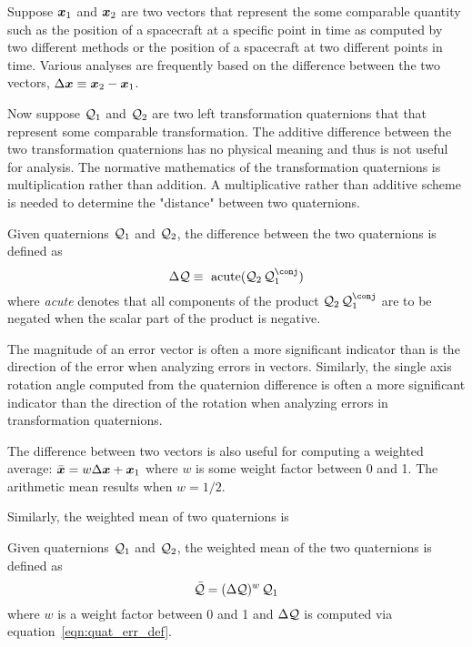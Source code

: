 Suppose $\boldsymbol{x}_1$ and $\boldsymbol{x}_2$ are two vectors
that represent the some comparable quantity
such as the position of a spacecraft at a specific point in time as computed
by two different methods
or the position of a spacecraft at two different points in time.
Various analyses are frequently based on the
difference between the two vectors,
$\Delta \boldsymbol{x} \equiv \boldsymbol{x}_2 - \boldsymbol{x}_1$.

Now suppose $\mathcal{Q}_1$ and $\mathcal{Q}_2$ are two left transformation
quaternions that that represent some comparable transformation.
The additive difference between the two transformation quaternions has no
physical meaning and thus is not useful for analysis.
The normative mathematics of the transformation quaternions is
multiplication rather than addition.
A multiplicative rather than additive scheme is needed to
determine the "distance" between two quaternions.
\begin{definition}\label{def:quat_err}
Given quaternions $\mathcal{Q}_1$ and $\mathcal{Q}_2$,
the difference between the two quaternions is defined as
\begin{equation}
  \Delta \quat Q \equiv \ 
                 \operatorname{acute} (\QxQ{\quat{Q}_2}{\quat{Q}_1^\conj})
  \label{eqn:quat_err_def}
\end{equation}
where \emph{acute} denotes that all components of the product
$\QxQ{\quat{Q}_2}{\quat{Q}_1^\conj}$
are to be negated when the scalar part of the product is negative.
\end{definition}

The magnitude of an error vector is often a more significant indicator
than is the direction of the error when analyzing errors in vectors.
Similarly, the single axis rotation angle computed from the quaternion
difference is often a more significant indicator than the direction of the
rotation when analyzing errors in transformation quaternions.

The difference between two vectors is also useful for computing
a weighted average:
$\bar{\boldsymbol{x}} = w  \Delta \boldsymbol{x} + \boldsymbol{x}_1$ where $w$ is some
weight factor between 0 and 1.
The arithmetic mean results when $w=1/2$.

Similarly, the weighted mean of two quaternions is
 \begin{definition}\label{def:quat_wmean}
Given quaternions $\mathcal{Q}_1$ and $\mathcal{Q}_2$,
the weighted mean of the two quaternions is defined as
\begin{equation}
  \bar{\quat Q} = \QxQ{(\Delta \quat Q)^w}{\quat{Q}_1}\label{eqn:quat_wmean_def}
\end{equation}
where $w$ is a weight factor between 0 and 1 and
$\Delta \mathcal{Q}$ is computed via equation~\eqref{eqn:quat_err_def}.
\end{definition}


